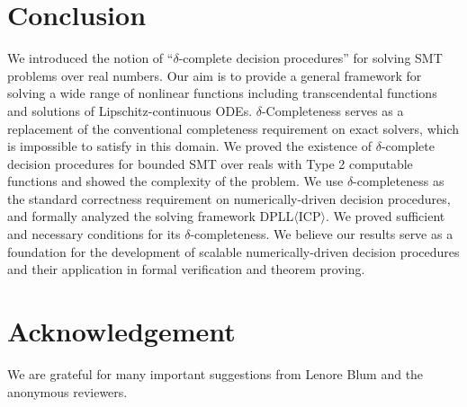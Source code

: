\documentclass[envcountsect]{llncs}
\begin{document}
\section{Conclusion}
We introduced the notion of ``$\delta$-complete decision procedures'' for solving SMT problems over real numbers. Our aim is to provide a general framework for solving a wide range of nonlinear functions including transcendental functions and solutions of Lipschitz-continuous ODEs. $\delta$-Completeness serves as a replacement of the conventional completeness requirement on exact solvers, which is impossible to satisfy in this domain. We proved the existence of $\delta$-complete decision procedures for bounded SMT over reals with Type 2 computable functions and showed the complexity of the problem. We use $\delta$-completeness as the standard correctness requirement on numerically-driven decision procedures, and formally analyzed the solving framework DPLL$\langle$ICP$\rangle$. We proved sufficient and necessary conditions for its $\delta$-completeness. We believe our results serve as a foundation for the development of scalable numerically-driven decision procedures and their application in formal verification and theorem proving.

\section*{Acknowledgement}
We are grateful for many important suggestions from Lenore Blum and the anonymous reviewers. 



\end{document}
